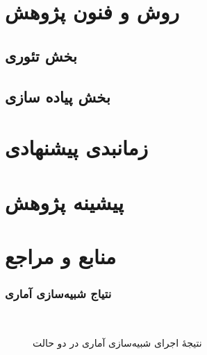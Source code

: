 \documentclass[xcolor=dvipsnames, professionalfonts, aspectratio=169, 11pt]{beamer}
\begin{document}
\section{روش و فنون پژوهش}
\subsection{بخش تئوری}
\subsection{بخش پیاده سازی}

\section{زمانبدی پیشنهادی }
\section{پیشینه پژوهش}

\section{منابع و مراجع}
\begin{frame}
    \begin{latin}
        \scriptsize
        
    \end{latin}

\end{frame}


\begin{frame}[noframenumbering]
    \frametitle{نتیاج شبیه‌سازی آماری}

    \begin{figure}[htb]
        \centering
        \
        \caption{نتیجهٔ اجرای شبیه‌سازی آماری در دو حالت}
        \label{fig:ode-sais}
    \end{figure}

\end{frame}
\end{document}
